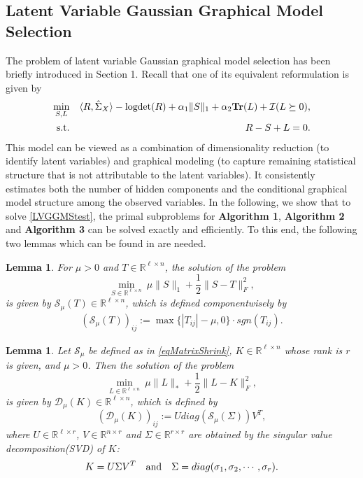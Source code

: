 \documentclass{mcom-l}
\newtheorem{lemma}[theorem]{Lemma}
\theoremstyle{definition}
\theoremstyle{remark}
\numberwithin{equation}{section}
\begin{document}
\subsection{Latent Variable Gaussian Graphical Model Selection}
The problem of latent variable Gaussian graphical model selection has been briefly introduced in Section 1. Recall that one of its equivalent reformulation is given by
\begin{eqnarray}
\min_{S,L}&&\langle R, \hat{\Sigma}_X \rangle - \hbox{logdet}(R) + \alpha_1 \| S \|_1 + \alpha_2 {\mathbf{Tr}}(L) + {\mathcal{I}}(L\succeq 0),\label{LVGGMStest}\\
\hbox{s.t.}&&R - S + L = 0\nonumber.
\end{eqnarray}
This model can be viewed as a combination of dimensionality reduction (to identify latent variables) and graphical modeling (to capture remaining statistical structure that is not attributable to
the latent variables). It consistently estimates both the number of hidden components and the conditional graphical model structure among the observed variables. In the following, we show that to solve \eqref{LVGGMStest}, the primal subproblems for {\bf{Algorithm 1}}, {\bf{Algorithm 2}} and {\bf{Algorithm 3}} can be solved exactly and efficiently. To this end, the following two lemmas which can be found in \cite{DaubechiesDefriseDe2004,MaGoldfarbChen2011} are needed.
\begin{lemma}
For $\mu >0$ and $T\in \mathbb{R}^{\ell\times n}$, the solution of the problem
$$
\min_{S\in \mathbb{R}^{\ell\times n}}\ \mu \|S\|_1 + \frac{1}{2}\| S - T \|_F^2,
$$
is given by ${\mathcal{S}}_{\mu}(T)\in \mathbb{R}^{\ell\times n}$, which is defined componentwisely by
\begin{align}
({\mathcal{S}}_{\mu}(T))_{ij}:=\max\{ |T_{ij}| - \mu,0 \}\cdot sgn(T_{ij}).\label{eqMatrixShrink}
\end{align}
\end{lemma}
\begin{lemma}
Let ${\mathcal{S}}_{\mu}$ be defined as in \eqref{eqMatrixShrink}, $K\in \mathbb{R}^{\ell\times n}$ whose rank is $r$ is given, and $\mu > 0$. Then the solution of the problem
$$
\min_{L\in \mathbb{R}^{\ell\times n}}\ \mu \|L\|_* + \frac{1}{2}\| L - K \|_F^2,
$$
is given by ${\mathcal{D}}_{\mu}(K)\in \mathbb{R}^{\ell\times n}$, which is defined by
$$
({\mathcal{D}}_{\mu}(K))_{ij}:=U diag({\mathcal{S}}_{\mu}(\Sigma))V^T,
$$
where $U\in \mathbb{R}^{\ell\times r}$, $V\in \mathbb{R}^{n\times r}$ and $\Sigma \in \mathbb{R}^{r\times r}$ are obtained by the singular value decomposition(SVD) of $K$:
$$
K = U\Sigma V^T\quad \hbox{and}\quad \Sigma = diag(\sigma_1,\sigma_2,\cdots,\sigma_r).
$$
\end{lemma}
\end{document}
